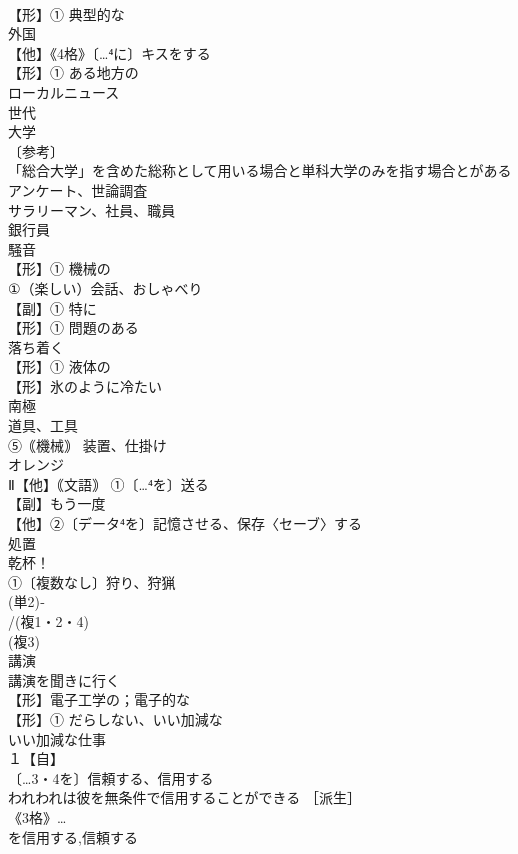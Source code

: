 \documentclass[8pt]{extreport}
\begin{document}
\begin{CJK}{UTF8}{min}
\\	【形】① 典型的な 
\\	外国
\\	【他】《4格》〔…⁴に〕キスをする
\\	【形】① ある地方の
\\	ローカルニュース
\\	世代
\\	大学
\\	〔参考〕
\\	「総合大学」を含めた総称として用いる場合と単科大学のみを指す場合とがある
\\	アンケート、世論調査
\\	サラリーマン、社員、職員 
\\	銀行員
\\	騒音
\\	【形】① 機械の 
\\	①（楽しい）会話、おしゃべり
\\	【副】① 特に 
\\	【形】① 問題のある
\\	落ち着く
\\	【形】① 液体の 
\\	【形】氷のように冷たい
\\	南極 
\\	道具、工具
\\	⑤｟機械｠ 装置、仕掛け
\\	オレンジ
\\	Ⅱ【他】｟文語｠ ①〔…⁴を〕送る
\\	【副】もう一度
\\	【他】②〔データ⁴を〕記憶させる、保存〈セーブ〉する 
\\	処置
\\	乾杯！
\\	①〔複数なし〕狩り、狩猟
\\	(単2)‐
\\	/(複1・2・4)
\\	(複3)
\\	講演
\\	講演を聞きに行く
\\	【形】電子工学の；電子的な
\\	【形】① だらしない、いい加減な 
\\	いい加減な仕事
\\	１【自】
\\	〔…3・4を〕信頼する、信用する
\\	われわれは彼を無条件で信用することができる ［派生］ 
\\	《3格》…
\\	を信用する,信頼する

\end{CJK}
\end{document}
